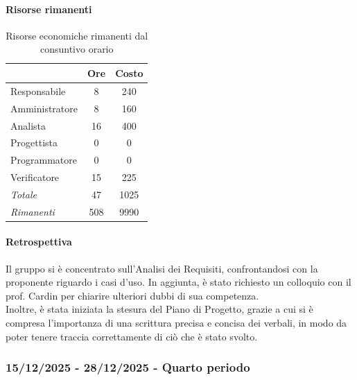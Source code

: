 \documentclass[a4paper,12pt]{article}
\begin{document}
            \paragraph{Risorse rimanenti}
                \begin{table}[H]
                \centering
                \begin{tabular}{|l|c|c|}
                \hline
                    \rowcolor{lightgray}{\textbf{Ruolo}} & {\textbf{Ore}} & {\textbf{Costo}}\\
                \hline
                    Responsabile & 8 & 240\\
                \hline
                    Amministratore & 8 & 160\\
                \hline
                    Analista & 16 & 400\\
                \hline
                    Progettista & 0 & 0\\
                \hline
                    Programmatore & 0 & 0\\
                \hline
                    Verificatore & 15 & 225\\
                \hline
                    \rowcolor{lightgray}\textit{Totale} & 47 & 1025\\
                \hline
                    \rowcolor{lightgray}\textit{Rimanenti} & 508 & 9990\\
                \hline
                \end{tabular}
                \caption{Risorse economiche rimanenti dal consuntivo orario}
                \end{table}
                
            \paragraph{Retrospettiva}
            Il gruppo si è concentrato sull'Analisi dei Requisiti, confrontandosi con la proponente riguardo i casi d'uso. In aggiunta, è stato richiesto un colloquio con il prof. Cardin per chiarire ulteriori dubbi di sua competenza.
            \\Inoltre, è stata iniziata la stesura del Piano di Progetto, grazie a cui si è compresa l'importanza di una scrittura precisa e concisa dei verbali, in modo da poter tenere traccia correttamente di ciò che è stato svolto.

        \subsubsection{15/12/2025 - 28/12/2025 - Quarto periodo}
\end{document}
